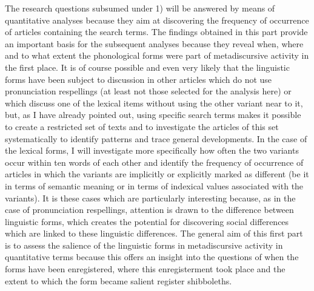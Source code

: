 The research questions subsumed under 1) will be answered by means of quantitative analyses because they aim at discovering the frequency of occurrence of articles containing the search terms. The findings obtained in this part provide an important basis for the subsequent analyses because they reveal when, where and to what extent the phonological forms were part of metadiscursive activity in the first place. It is of course possible and even very likely that the linguistic forms have been subject to discussion in other articles which do not use pronunciation respellings (at least not those selected for the analysis here) or which discuss one of the lexical items without using the other variant near to it, but, as I have already pointed out, using specific search terms makes it possible to create a restricted set of texts and to investigate the articles of this set systematically to identify patterns and trace general developments. In the case of the lexical forms, I will investigate more specifically how often the two variants occur within ten words of each other and identify the frequency of occurrence of articles in which the variants are implicitly or explicitly marked as different (be it in terms of semantic meaning or in terms of indexical values associated with the variants). It is these cases which are particularly interesting because, as in the case of pronunciation respellings, attention is drawn to the difference between linguistic forms, which creates the potential for discovering social differences which are linked to these linguistic differences. The general aim of this first part is to assess the salience of the linguistic forms in metadiscursive activity in quantitative terms because this offers an insight into the questions of when the forms have been enregistered, where this enregisterment took place and the extent to which the form became salient register shibboleths.

